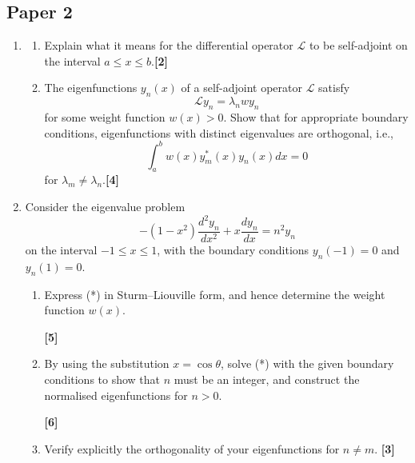 \documentclass[a4paper]{article}
\begin{document}
\subsection{Paper 2}
\begin{qns}\leavevmode
\begin{enumerate}[label=(\alph*)]
\item 
\begin{enumerate}[label=(\roman*)]
\item Explain what it means for the differential operator $\mathcal{L}$ to be self-adjoint on the interval
$a\leq x\leq b$.\hfill \textbf{[2]}
\item The eigenfunctions $y_n(x)$ of a self-adjoint operator $\mathcal{L}$ satisfy
$$\mathcal{L}y_n=\lambda_nwy_n$$
for some weight function $w(x) > 0$. Show that for appropriate boundary conditions, eigenfunctions with distinct eigenvalues are orthogonal, i.e.,
$$\int_a^bw(x)y_m^*(x)y_n(x)dx=0$$
for $\lambda_m\neq\lambda_n$.\hfill \textbf{[4]}
\end{enumerate}
\item Consider the eigenvalue problem
\begin{equation}
-(1-x^2)\frac{d^2y_n}{dx^2}+x\frac{dy_n}{dx}=n^2y_n\tag{*}
\end{equation}
on the interval $-1\leq x\leq 1$, with the boundary conditions $y_n(−1) = 0$ and $y_n(1) = 0$.
\begin{enumerate}[label=(\roman*)]
\item  Express (*) in Sturm–Liouville form, and hence determine the weight function $w(x)$. 

\hfill \textbf{[5]}
\item By using the substitution $x=\cos\theta$, solve (*) with the given boundary conditions to show that $n$ must be an integer, and construct the normalised eigenfunctions for $n > 0$. 

\hfill \textbf{[6]}
\item Verify explicitly the orthogonality of your eigenfunctions for $n\neq m$. \hfill \textbf{[3]}
\end{enumerate}
\end{enumerate}
\end{qns}
\end{document}
